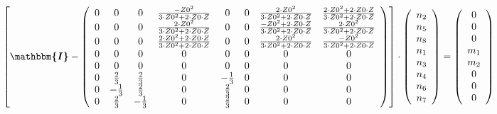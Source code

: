\[ \left[ \boldsymbol{\mathbbm{I}}  - \left(\begin{array}{cccccccc} 0
& 0 & 0 & \frac{-Z0^2}{3\cdot Z0^2+2\cdot Z0\cdot Z} & 0 & 0 &
\frac{2\cdot Z0^2}{3\cdot Z0^2+2\cdot Z0\cdot Z} & \frac{2\cdot
Z0^2+2\cdot Z0\cdot Z}{3\cdot Z0^2+2\cdot Z0\cdot Z} \\ 0 & 0 & 0 &
\frac{2\cdot Z0^2}{3\cdot Z0^2+2\cdot Z0\cdot Z} & 0 & 0 &
\frac{-Z0^2+2\cdot Z0\cdot Z}{3\cdot Z0^2+2\cdot Z0\cdot Z} &
\frac{2\cdot Z0^2}{3\cdot Z0^2+2\cdot Z0\cdot Z} \\ 0 & 0 & 0 &
\frac{2\cdot Z0^2+2\cdot Z0\cdot Z}{3\cdot Z0^2+2\cdot Z0\cdot Z} & 0
& 0 & \frac{2\cdot Z0^2}{3\cdot Z0^2+2\cdot Z0\cdot Z} &
\frac{-Z0^2}{3\cdot Z0^2+2\cdot Z0\cdot Z} \\ 0 & 0 & 0 & 0 & 0 & 0 &
0 & 0 \\ 0 & 0 & 0 & 0 & 0 & 0 & 0 & 0 \\ 0 & \frac{2}{3} &
\frac{2}{3} & 0 & -\frac{1}{3} & 0 & 0 & 0 \\ 0 & -\frac{1}{3} &
\frac{2}{3} & 0 & \frac{2}{3} & 0 & 0 & 0 \\ 0 & \frac{2}{3} &
-\frac{1}{3} & 0 & \frac{2}{3} & 0 & 0 & 0 \end{array}\right)\right]
\cdot \left(\begin{array}{c} n_{2} \\ n_{5} \\ n_{8} \\ n_{1} \\ n_{3}
\\ n_{4} \\ n_{6} \\ n_{7} \end{array}\right) = \left(\begin{array}{c}
0 \\ 0 \\ 0 \\ m_{1} \\ m_{2} \\ 0 \\ 0 \\ 0 \end{array}\right) \]
